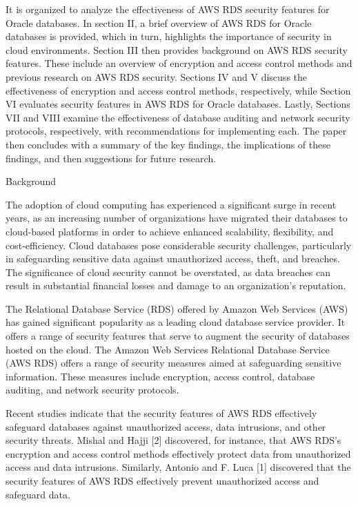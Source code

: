 \documentclass{ieee}
\begin{document}
It is organized to analyze the effectiveness of AWS RDS security features for Oracle databases. In section II, a brief overview of AWS RDS for Oracle databases is provided, which in turn, highlights the importance of security in cloud environments. Section III then provides background on AWS RDS security features. These include an overview of encryption and access control methods and previous research on AWS RDS security. Sections IV and V discuss the effectiveness of encryption and access control methods, respectively, while Section VI evaluates security features in AWS RDS for Oracle databases. Lastly, Sections VII and VIII examine the effectiveness of database auditing and network security protocols, respectively, with recommendations for implementing each. The paper then concludes with a summary of the key findings, the implications of these findings, and then suggestions for future research. 


\h{Background}

The adoption of cloud computing has experienced a significant surge in recent years, as an increasing number of organizations have migrated their databases to cloud-based platforms in order to achieve enhanced scalability, flexibility, and cost-efficiency. Cloud databases pose considerable security challenges, particularly in safeguarding sensitive data against unauthorized access, theft, and breaches. The significance of cloud security cannot be overstated, as data breaches can result in substantial financial losses and damage to an organization's reputation.

The Relational Database Service (RDS) offered by Amazon Web Services (AWS) has gained significant popularity as a leading cloud database service provider. It offers a range of security features that serve to augment the security of databases hosted on the cloud. The Amazon Web Services Relational Database Service (AWS RDS) offers a range of security measures aimed at safeguarding sensitive information. These measures include encryption, access control, database auditing, and network security protocols.

Recent studies indicate that the security features of AWS RDS effectively safeguard databases against unauthorized access, data intrusions, and other security threats. Mishal and Hajji [2] discovered, for instance, that AWS RDS's encryption and access control methods effectively protect data from unauthorized access and data intrusions. Similarly, Antonio and F. Luca [1] discovered that the security features of AWS RDS effectively prevent unauthorized access and safeguard data.
\end{document}
